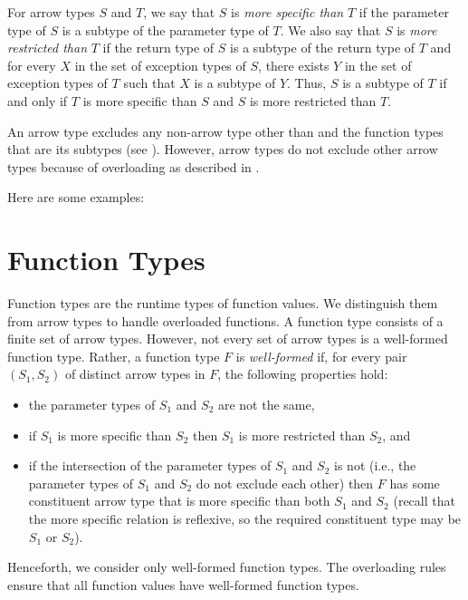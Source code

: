 For arrow types $S$ and $T$,
we say that $S$ is \emph{more specific than} $T$
if the parameter type of $S$ is a subtype of the parameter type of $T$.
We also say that $S$ is \emph{more restricted than} $T$
if the return type of $S$ is a subtype of the return type of $T$
and for every $X$ in the set of exception types of $S$,
there exists $Y$ in the set of exception types of $T$ such that
$X$ is a subtype of $Y$.
Thus, $S$ is a subtype of $T$ if and only if
$T$ is more specific than $S$ and $S$ is more restricted than $T$.

An arrow type excludes any non-arrow type other than 
and the function types that are its subtypes (see ).
However, arrow types do not exclude other arrow types because of
overloading as described in .

Here are some examples:
%

\section{Function Types}

Function types are the runtime types of function values.
We distinguish them from arrow types
to handle overloaded functions.
A function type consists of a finite set of arrow types.
However, not every set of arrow types is a well-formed function type.
Rather, a function type $F$ is \emph{well-formed} if,
for every pair $(S_1,S_2)$ of distinct arrow types in $F$,
the following properties hold:
\begin{itemize}

\item
the parameter types of $S_1$ and $S_2$ are not the same,

\item
if $S_1$ is more specific than $S_2$
then $S_1$ is more restricted than $S_2$, and

\item
if the intersection of the parameter types of $S_1$ and $S_2$
is not 
(i.e., the parameter types of $S_1$ and $S_2$ do not exclude each other)
then $F$ has some constituent arrow type
that is more specific than both $S_1$ and $S_2$
(recall that the more specific relation is reflexive,
so the required constituent type may be $S_1$ or $S_2$).

\end{itemize}

Henceforth, we consider only well-formed function types.
The overloading rules ensure that all function values
have well-formed function types.

